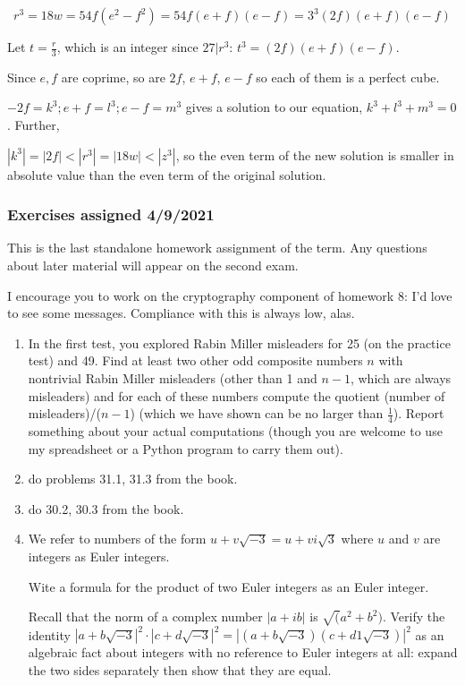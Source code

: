 \documentclass[12pt]{article}
\begin{document}
$$r^3=18w=54f(e^2-f^2)=54f(e+f)(e-f)=3^3(2f)(e+f)(e-f)$$

Let $t=\frac r3$, which is an integer since $27|r^3$:  $t^3=(2f)(e+f)(e-f)$.

Since $e,f$ are coprime, so are $2f$, $e+f$, $e-f$ so each of them is a perfect cube.

$-2f=k^3; e+f=l^3; e-f=m^3$ gives a solution to our equation, $k^3+l^3+m^3=0$.   Further, 

$|k^3| = |2f| < |r^3| = |18w| < |z^3|$, so the even term of the new solution is smaller in absolute value than the even term of the original solution.

\subsubsection{Exercises assigned 4/9/2021}

This is the last standalone homework assignment of the term.  Any questions about later material will appear on the second exam.

I encourage you to work on the cryptography component of homework 8:  I'd love to see some messages.  Compliance with this is always low, alas.

\begin{enumerate}

\item  In the first test, you explored Rabin Miller misleaders for 25 (on the practice test) and 49.  Find at least two other odd composite numbers $n$ with nontrivial Rabin Miller misleaders (other than 1 and $n-1$, which are always misleaders) and for each
of these numbers compute the quotient (number of misleaders)/($n-1$) (which we have shown can be no larger than $\frac 14$).  Report something about your actual computations (though you are welcome to use my spreadsheet or a Python program to carry them out).

\item  do problems 31.1, 31.3 from the book.

\item  do 30.2, 30.3 from the book.

\item  We refer to numbers of the form $u +v\sqrt{-3}=u+vi\sqrt 3$ where $u$ and $v$ are integers as Euler integers.

Wite a formula for the product of two Euler integers as an Euler integer.

Recall that the norm of a complex number $|a+ib|$ is $\sqrt(a^2 + b^2)$.
Verify the identity $|a+b\sqrt{-3}|^2\cdot |c+d\sqrt{-3}|^2 = |(a+b\sqrt{-3})(c+d1\sqrt{-3})|^2$ as an algebraic fact about integers with no reference to Euler integers at all:  expand the two sides separately then show that they are equal.

\end{enumerate}
\end{document}
